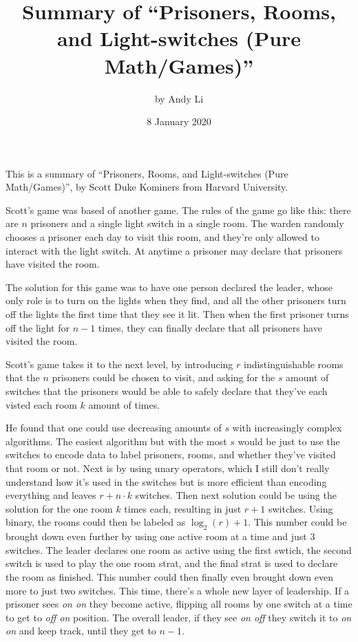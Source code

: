 \documentclass[12pt]{article}
\begin{document}
\title{
  Summary of ``Prisoners, Rooms, and Light-switches (Pure Math/Games)''
}
\author{by Andy Li}
\date{8 January 2020}
\maketitle

This is a summary of ``Prisoners, Rooms, and Light-switches (Pure Math/Games)'', by Scott Duke Kominers from Harvard University.

Scott's game was based of another game. The rules of the game go like this: there are \(n\) prisoners and a single light switch in a single room. The warden randomly chooses a prisoner each day to visit this room, and they're only allowed to interact with the light switch. At anytime a prisoner may declare that prisoners have visited the room. 

The solution for this game was to have one person declared the leader, whose only role is to turn on the lights when they find, and all the other prisoners turn off the lights the first time that they see it lit. Then when the first prisoner turns off the light for \(n-1\) times, they can finally declare that all prisoners have visited the room.

Scott's game takes it to the next level, by introducing \(r\) indistinguishable rooms that the \(n\) prisoners could be chosen to visit, and asking for the \(s\) amount of switches that the prisoners would be able to safely declare that they've each visted each room \(k\) amount of times. 

He found that one could use decreasing amounts of \(s\) with increasingly complex algorithms. The easiest algorithm but with the most \(s\) would be just to use the switches to encode data to label prisoners, rooms, and whether they've visited that room or not. Next is by using unary operators, which I still don't really understand how it's used in the switches but is more efficient than encoding everything and leaves \(r + n \cdot k\) switches. Then next solution could be using the solution for the one room \(k\) times each, resulting in just \(r + 1\) switches. Using binary, the rooms could then be labeled as \(\log_{2}(r)+1\). This number could be brought down even further by using one active room at a time and just \(3\) switches. The leader declares one room as active using the first swtich, the second switch is used to play the one room strat, and the final strat is used to declare the room as finished. This number could then finally even brought down even more to just two switches. This time, there's a whole new layer of leadership. If a prisoner sees \textit{on on} they become active, flipping all rooms by one switch at a time to get to \textit{off on} position. The overall leader, if they see \textit{on off} they switch it to \textit{on on} and keep track, until they get to \(n-1\).
\end{document}
